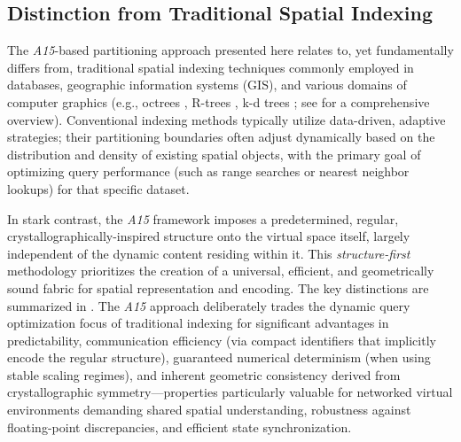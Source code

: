 \documentclass[10pt]{article}
\def\AAAB{\textit{A15}}
\begin{document}
\subsection{Distinction from Traditional Spatial Indexing}\label{subsec:comparison-indexing}

The \AAAB{}-based partitioning approach presented here relates to, yet fundamentally differs from, traditional spatial indexing techniques commonly employed in databases, geographic information systems (GIS), and various domains of computer graphics (e.g., octrees \cite{Finkel1974}, R-trees \cite{Guttman1984}, k-d trees \cite{Bentley1975}; see \cite{Samet1990} for a comprehensive overview). Conventional indexing methods typically utilize data-driven, adaptive strategies; their partitioning boundaries often adjust dynamically based on the distribution and density of existing spatial objects, with the primary goal of optimizing query performance (such as range searches or nearest neighbor lookups) for that specific dataset.

In stark contrast, the \AAAB{} framework imposes a predetermined, regular, crystallographically-inspired structure onto the virtual space itself, largely independent of the dynamic content residing within it. This \emph{structure-first} methodology prioritizes the creation of a universal, efficient, and geometrically sound fabric for spatial representation and encoding. The key distinctions are summarized in . The \AAAB{} approach deliberately trades the dynamic query optimization focus of traditional indexing for significant advantages in predictability, communication efficiency (via compact identifiers that implicitly encode the regular structure), guaranteed numerical determinism (when using stable scaling regimes), and inherent geometric consistency derived from crystallographic symmetry—properties particularly valuable for networked virtual environments demanding shared spatial understanding, robustness against floating-point discrepancies, and efficient state synchronization.
\end{document}
